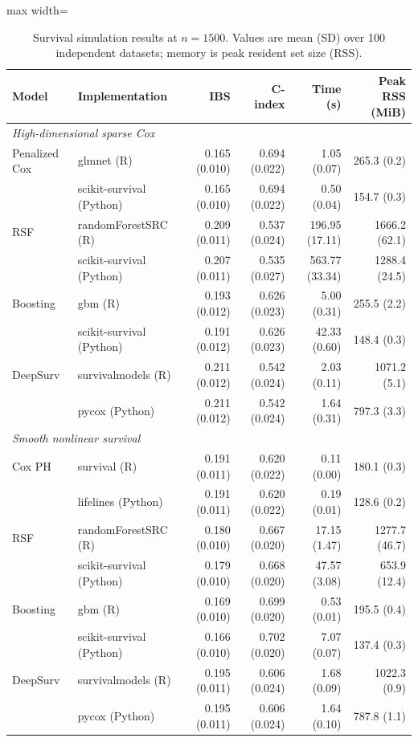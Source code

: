 \begin{table}[htbp]
\centering
\small
\caption{Survival simulation results at $n=1500$. Values are mean (SD) over 100 independent datasets; memory is peak resident set size (RSS).}
\label{tab:survival_simulation_results_n1500}
\setlength{\tabcolsep}{3pt}
\renewcommand{\arraystretch}{1.1}
\begin{adjustbox}{max width=\linewidth}
\begin{tabular}{llrrrr}
\toprule
Model & Implementation & IBS & C-index & Time (s) & Peak RSS (MiB) \\
\midrule
\multicolumn{6}{l}{\textit{High-dimensional sparse Cox}}\\
Penalized Cox & glmnet (R) & 0.165 (0.010) & 0.694 (0.022) & 1.05 (0.07) & 265.3 (0.2) \\
 & scikit-survival (Python) & 0.165 (0.010) & 0.694 (0.022) & 0.50 (0.04) & 154.7 (0.3) \\
RSF & randomForestSRC (R) & 0.209 (0.011) & 0.537 (0.024) & 196.95 (17.11) & 1666.2 (62.1) \\
 & scikit-survival (Python) & 0.207 (0.011) & 0.535 (0.027) & 563.77 (33.34) & 1288.4 (24.5) \\
Boosting & gbm (R) & 0.193 (0.012) & 0.626 (0.023) & 5.00 (0.31) & 255.5 (2.2) \\
 & scikit-survival (Python) & 0.191 (0.012) & 0.626 (0.023) & 42.33 (0.60) & 148.4 (0.3) \\
DeepSurv & survivalmodels (R) & 0.211 (0.012) & 0.542 (0.024) & 2.03 (0.11) & 1071.2 (5.1) \\
 & pycox (Python) & 0.211 (0.012) & 0.542 (0.024) & 1.64 (0.31) & 797.3 (3.3) \\
\midrule
\multicolumn{6}{l}{\textit{Smooth nonlinear survival}}\\
Cox PH & survival (R) & 0.191 (0.011) & 0.620 (0.022) & 0.11 (0.00) & 180.1 (0.3) \\
 & lifelines (Python) & 0.191 (0.011) & 0.620 (0.022) & 0.19 (0.01) & 128.6 (0.2) \\
RSF & randomForestSRC (R) & 0.180 (0.010) & 0.667 (0.020) & 17.15 (1.47) & 1277.7 (46.7) \\
 & scikit-survival (Python) & 0.179 (0.010) & 0.668 (0.020) & 47.57 (3.08) & 653.9 (12.4) \\
Boosting & gbm (R) & 0.169 (0.010) & 0.699 (0.020) & 0.53 (0.01) & 195.5 (0.4) \\
 & scikit-survival (Python) & 0.166 (0.010) & 0.702 (0.020) & 7.07 (0.07) & 137.4 (0.3) \\
DeepSurv & survivalmodels (R) & 0.195 (0.011) & 0.606 (0.024) & 1.68 (0.09) & 1022.3 (0.9) \\
 & pycox (Python) & 0.195 (0.011) & 0.606 (0.024) & 1.64 (0.10) & 787.8 (1.1) \\
\bottomrule
\end{tabular}
\end{adjustbox}
\end{table}
